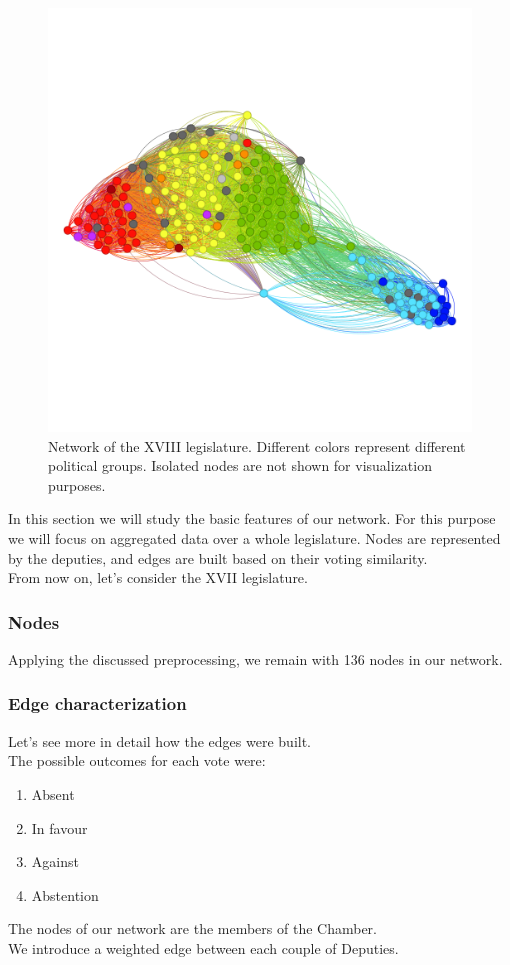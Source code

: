 \begin{figure}[h]
  \centering
  \includegraphics[width=\linewidth]{img/xviii_graph.png}
  \caption{Network of the XVIII legislature. Different colors represent different political groups. Isolated nodes are not shown for visualization purposes.}
  \label{fig:graph}
\end{figure}


In this section we will study the basic features of our network. For this purpose we will focus on aggregated data over a whole legislature. Nodes are represented by the deputies, and edges are built based on their voting similarity.\\
From now on, let's consider the XVII legislature.

\subsubsection{Nodes}
Applying the discussed preprocessing, we remain with 136 nodes in our network.

\subsubsection{Edge characterization}
Let's see more in detail how the edges were built.\\
The possible outcomes for each vote were:
\begin{enumerate}
    \item Absent
    \item In favour
    \item Against
    \item Abstention
\end{enumerate}
The nodes of our network are the members of the Chamber.\\
We introduce a weighted edge between each couple of Deputies.\\
\newpage

